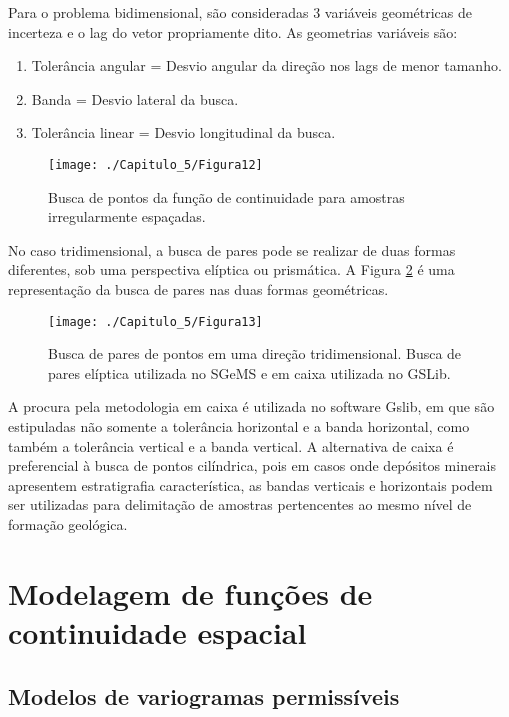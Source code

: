Para o problema bidimensional, são consideradas 3 variáveis geométricas de incerteza e o lag do vetor propriamente dito. As geometrias variáveis são:

\begin{enumerate}
	\item 	Tolerância angular = Desvio angular da direção nos lags de menor tamanho.
	\item 	Banda = Desvio lateral da busca. 
	\item	Tolerância linear = Desvio longitudinal da busca.
	
\end{enumerate}

\begin{figure}[H]
	\centering
	\texttt{[image: ./Capitulo\_5/Figura12]}
	\caption{Busca de pontos da função de continuidade para amostras irregularmente espaçadas.}
	\label{Figura12}
\end{figure}

No caso tridimensional, a busca de pares pode se realizar de duas formas diferentes, sob uma perspectiva elíptica ou prismática. A Figura \ref{Figura13} é uma representação da busca de pares nas duas formas geométricas. 


\begin{figure}[H]
	\centering
	\texttt{[image: ./Capitulo\_5/Figura13]}
	\caption{Busca de pares de pontos em uma direção tridimensional. Busca de pares elíptica utilizada no SGeMS e em caixa utilizada no GSLib.}
	\label{Figura13}
\end{figure}

A procura pela metodologia em caixa é utilizada no software Gslib, em que são estipuladas não somente a tolerância horizontal e a banda horizontal, como também a tolerância vertical e a banda vertical. A alternativa de caixa é preferencial à busca de pontos cilíndrica, pois em casos onde depósitos minerais apresentem estratigrafia característica, as bandas verticais e horizontais podem ser utilizadas para delimitação de amostras pertencentes ao mesmo nível de formação geológica. 

\section{Modelagem de funções de continuidade espacial}

\subsection{Modelos de variogramas permissíveis}

